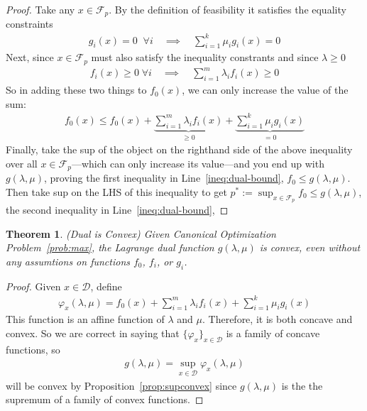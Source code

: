 \documentclass[12pt]{article}
\numberwithin{equation}{section} %
\theoremstyle{plain}
\newtheorem{thm}{Theorem}[section]
\theoremstyle{definition}
\theoremstyle{remark}
\newcommand{\sF}{\mathscr{F}}
\begin{document}
\begin{proof}
Take any $x\in \mathscr{F}_p$. By the definition of feasibility it
satisfies the equality constraints
\begin{align*}
  g_i(x)=0 \;\; \forall i
  \quad\implies\quad
  \sum_{i=1}^k \mu_i g_i(x) = 0
\end{align*}
Next, since $x\in\sF_p$ must also satisfy the inequality constrants and
since $\lambda\geq 0$
\begin{align*}
  f_i(x) \geq 0 \; \forall i
  \quad\implies\quad
  \sum_{i=1}^m \lambda_i f_i(x) \geq 0
\end{align*}
So in adding these two things to $f_0(x)$, we can only increase the
value of the sum:
\begin{align}
  f_0(x) \leq f_0(x)
  + \underbrace{\sum_{i=1}^m \lambda_if_i(x)}_{\geq 0}
  + \underbrace{\sum_{i=1}^k \mu_ig_i(x)}_{=0}
  \label{ineq:dual-bound-almost}
\end{align}
Finally, take the sup of the object on the righthand side of the above
inequality over all $x\in\sF_p$---which can only increase its
value---and you end up with $g(\lambda,\mu)$, proving the first
inequality in Line~\ref{ineq:dual-bound}, $f_0\leq g(\lambda,\mu)$.
Then take sup on the LHS of this inequality to get
$p^*:=\sup_{x\in\sF_p}f_0\leq g(\lambda,\mu)$, the second inequality in
Line~\ref{ineq:dual-bound},
\end{proof}

\begin{thm}{\emph{(Dual is Convex)}}
\label{thm:dual-convex}
Given Canonical Optimization Problem~\ref{prob:max}, the Lagrange dual
function $g(\lambda,\mu)$ is \emph{convex}, even without any assumtions
on functions $f_0$, $f_i$, or $g_i$.
\end{thm}
\begin{proof}
Given $x\in\mathcal{D}$, define
\begin{align*}
  \varphi_x(\lambda,\mu) = f_0(x)
    + \sum^m_{i=1} \lambda_i f_i(x)
    + \sum^k_{i=1} \mu_i g_i(x)
\end{align*}
This function is an affine function of $\lambda$ and $\mu$. Therefore,
it is both concave and convex. So we are correct in saying that
$\{\varphi_x\}_{x\in\mathcal{D}}$ is a family of concave functions, so
\begin{align*}
  g(\lambda,\mu) = \sup_{x\in\mathcal{D}} \varphi_x(\lambda,\mu)
\end{align*}
will be convex by Proposition~\ref{prop:supconvex} since
$g(\lambda,\mu)$ is the the supremum of a family of convex functions.

\end{proof}
\end{document}
